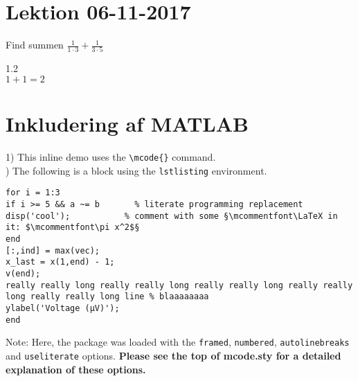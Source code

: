 \section{Lektion 06-11-2017}



\begin{prob}[Noter]  Find summen $\displaystyle \frac{1}{1\cdot 3}+\frac{1}{3\cdot 5}$ \end{prob}

\begin{exmp}  1.2\\ $1+1=2$ \end{exmp}

\section*{Inkludering af MATLAB}

1) This inline demo  uses the \verb|\mcode{}| command.\\

) The following is a block using the \verb|lstlisting| environment.
\begin{lstlisting}
for i = 1:3
if i >= 5 && a ~= b       % literate programming replacement
disp('cool');           % comment with some §\mcommentfont\LaTeX in it: $\mcommentfont\pi x^2$§
end
[:,ind] = max(vec);
x_last = x(1,end) - 1;
v(end);
really really long really really long really really long really really long really really long line % blaaaaaaaa
ylabel('Voltage (µV)');
end
\end{lstlisting}
Note: Here, the package was loaded with the \verb|framed|, \verb|numbered|, \verb|autolinebreaks| and \verb|useliterate| options.  \textbf{Please see the top of mcode.sty for a detailed explanation of these options.}


